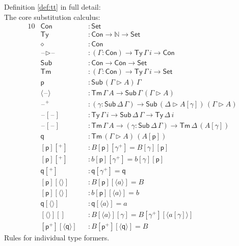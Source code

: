 \documentclass[sigplan,10pt,anonymous,review]{acmart}\settopmatter{printfolios=true,printccs=false,printacmref=false}
\newcommand{\ra}{\rightarrow}
\newcommand{\Set}{\mathsf{Set}}
\newcommand{\Ty}{\mathsf{Ty}}
\newcommand{\Tm}{\mathsf{Tm}}
\newcommand{\Con}{\mathsf{Con}}
\newcommand{\Sub}{\mathsf{Sub}}
\newcommand{\p}{\mathsf{p}}
\newcommand{\q}{\mathsf{q}}
\newcommand{\ext}{\mathop{\triangleright}}
\newcommand{\N}{\mathbb{N}}
\newcommand{\blank}{\mathord{\hspace{1pt}\text{--}\hspace{1pt}}} %
\begin{document}
Definition \ref{def:tt} in full detail: \\
The core substitution calculus:
\begin{alignat*}{10}
  & \Con && : \Set \\
  & \Ty && : \Con\ra\N\ra\Set \\
  & \diamond && : \Con \\
  & \blank\ext\blank && : (\Gamma:\Con)\ra\Ty\,\Gamma\,i\ra\Con \\
  & \Sub && : \Con\ra\Con\ra\Set \\
  & \Tm && : (\Gamma:\Con)\ra\Ty\,\Gamma\,i\ra\Set \\
  & \p && : \Sub\,(\Gamma\ext A)\,\Gamma \\
  & \langle\blank\rangle && : \Tm\,\Gamma\,A\ra\Sub\,\Gamma\,(\Gamma\ext A) \\
  & \blank^+ && : (\gamma:\Sub\,\Delta\,\Gamma)\ra\Sub\,(\Delta\ext A[\gamma])\,(\Gamma\ext A) \\
  & \blank[\blank] && : \Ty\,\Gamma\,i\ra\Sub\,\Delta\,\Gamma\ra\Ty\,\Delta\,i \\
  & \blank[\blank] && : \Tm\,\Gamma\,A\ra(\gamma:\Sub\,\Delta\,\Gamma)\ra\Tm\,\Delta\,(A[\gamma]) \\
  & \q && : \Tm\,(\Gamma\ext A)\,(A[\p]) \\
  & [\p][^+] && : B[\p][\gamma^+] = B[\gamma][\p] \\
  & [\p][^+] && : b[\p][\gamma^+] = b[\gamma][\p] \\
  & \q[^+] && : \q[\gamma^+] = \q \\
  & [\p][\langle\rangle] && : B[\p][\langle a\rangle] = B \\
  & [\p][\langle\rangle] && : b[\p ][\langle a\rangle] = b \\
  & \q[\langle\rangle] && : \q[\langle a\rangle] = a \\
  & [\langle\rangle][] && : B[\langle a\rangle][\gamma] = B[\gamma^+][\langle a[\gamma]\rangle] \\
  & [\p^+][\langle\q\rangle] && : B[\p^+][\langle\q\rangle] = B
\end{alignat*}
Rules for individual type formers.
\end{document}
